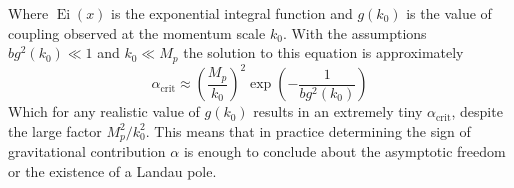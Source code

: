 \documentclass[11pt, a4paper]{article}
\begin{document}
Where $\operatorname{Ei}(x)$ is the exponential integral function and $g(k_0)$ is the value of coupling observed at the momentum scale $k_0$. With the assumptions $b g^2(k_0) \ll 1$ and $k_0 \ll M_p$ the solution to this equation is approximately
\begin{equation}
    \alpha_{\text{crit}} \approx \left( \frac{M_p}{k_0} \right)^2 \operatorname{exp}{\left( - \frac{1}{b g^2(k_0)} \right)}
\end{equation}
Which for any realistic value of $g(k_0)$ results in an extremely tiny $\alpha_{\text{crit}}$, despite the large factor $M_p^2/k_0^2$.
This means that in practice determining the sign of gravitational contribution $\alpha$ is enough to conclude about the asymptotic freedom or the existence of a Landau pole.
\end{document}
